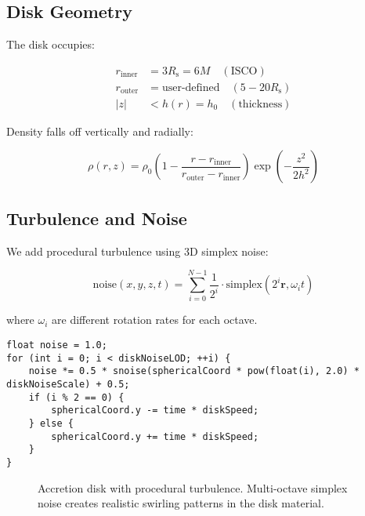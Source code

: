 \documentclass[12pt,a4paper]{article}
\theoremstyle{definition}
\theoremstyle{remark}
\newcommand{\Rs}{R_{\text{s}}}
\begin{document}
\subsection{Disk Geometry}

The disk occupies:

\begin{align}
    r_{\text{inner}} &= 3\Rs = 6M \quad (\text{ISCO}) \\
    r_{\text{outer}} &= \text{user-defined} \quad (5-20\Rs) \\
    |z| &< h(r) = h_0 \quad (\text{thickness})
\end{align}

Density falls off vertically and radially:

\begin{equation}
    \rho(r, z) = \rho_0 \left(1 - \frac{r - r_{\text{inner}}}{r_{\text{outer}} - r_{\text{inner}}}\right) \exp\left(-\frac{z^2}{2h^2}\right)
\end{equation}

\subsection{Turbulence and Noise}

We add procedural turbulence using 3D simplex noise:

\begin{equation}
    \text{noise}(x, y, z, t) = \sum_{i=0}^{N-1} \frac{1}{2^i} \cdot \text{simplex}(2^i \mathbf{r}, \omega_i t)
\end{equation}

where $\omega_i$ are different rotation rates for each octave.

\begin{lstlisting}[style=metalstyle, caption=Multi-octave noise for turbulence]
float noise = 1.0;
for (int i = 0; i < diskNoiseLOD; ++i) {
    noise *= 0.5 * snoise(sphericalCoord * pow(float(i), 2.0) * diskNoiseScale) + 0.5;
    if (i % 2 == 0) {
        sphericalCoord.y -= time * diskSpeed;
    } else {
        sphericalCoord.y += time * diskSpeed;
    }
}
\end{lstlisting}

\begin{figure}[H]
    \centering
    \caption{Accretion disk with procedural turbulence. Multi-octave simplex noise creates realistic swirling patterns in the disk material.}
    \label{fig:disk_turbulence}
\end{figure}
\end{document}
